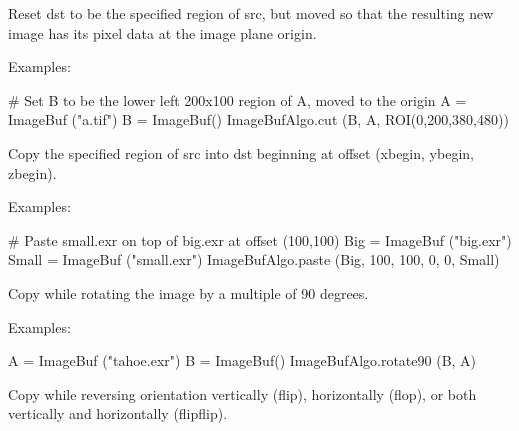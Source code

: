  
Reset {\cf dst} to be the specified region of {\cf src}, but moved so
that the resulting new image has its pixel data at the image plane origin.

\smallskip
\noindent Examples:
\begin{code}
    # Set B to be the lower left 200x100 region of A, moved to the origin
    A = ImageBuf ("a.tif")
    B = ImageBuf()
    ImageBufAlgo.cut (B, A, ROI(0,200,380,480))
\end{code}
\apiend


 
Copy the specified region of {\cf src} into {\cf dst} beginning at 
offset {\cf (xbegin, ybegin, zbegin)}.

\smallskip
\noindent Examples:
\begin{code}
    # Paste small.exr on top of big.exr at offset (100,100)
    Big = ImageBuf ("big.exr")
    Small = ImageBuf ("small.exr")
    ImageBufAlgo.paste (Big, 100, 100, 0, 0, Small)
\end{code}
\apiend


 
 
 
Copy while rotating the image by a multiple of 90 degrees.

\smallskip
\noindent Examples:
\begin{code}
    A = ImageBuf ("tahoe.exr")
    B = ImageBuf()
    ImageBufAlgo.rotate90 (B, A)
\end{code}
\apiend



 
 
 
Copy while reversing orientation vertically (flip), horizontally (flop),
or both vertically and horizontally (flipflip).

